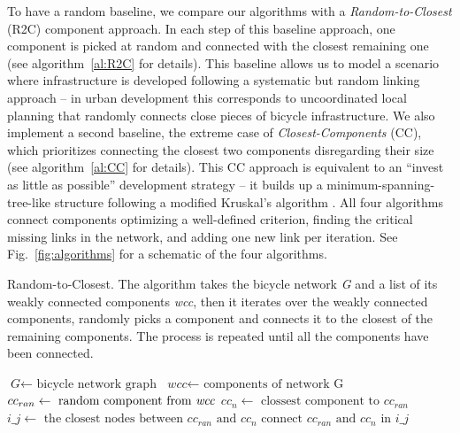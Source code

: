 To have a random baseline, we compare our algorithms with a \emph{Random-to-Closest} (R2C) component approach. In each step of this baseline approach, one component is picked at random and connected with the closest remaining one (see algorithm~\ref{al:R2C} for details). This baseline allows us to model a scenario where infrastructure is developed following a systematic but random linking approach -- in urban development this corresponds to uncoordinated local planning that randomly connects close pieces of bicycle infrastructure. We also implement a second baseline, the extreme case of \emph{Closest-Components} (CC), which prioritizes connecting the closest two components disregarding their size (see algorithm~\ref{al:CC} for details). This CC approach is equivalent to an ``invest as little as possible'' development strategy -- it builds up a minimum-spanning-tree-like structure  following a modified Kruskal's algorithm \cite{Kruskal1956Spanning}. All four algorithms connect components optimizing a well-defined criterion, finding the critical missing links in the network, and adding one new link per iteration. See Fig.~\ref{fig:algorithms} for a schematic of the four algorithms.


\begin{algorithm}[h!]
  \caption{Random-to-Closest. The algorithm takes the bicycle network \textit{G} and a list of its weakly connected components \textit{wcc}, then it iterates over the weakly connected components, randomly picks a component and connects it to the closest of the remaining components. The process is repeated until all the components have been connected.}\label{al:R2C}
  \begin{algorithmic}[1]
    \State $\textit{G} \gets \text{ bicycle network graph}$
    \State $\textit{wcc} \gets \text{ components of network G}$
    \State $cc_{ran} \gets \text{ random component from \textit{wcc}}$
    \State $cc_n \gets \text{ clossest component to } cc_{ran}$
    \State $\textit{i\_j} \gets \text{ the closest nodes between } cc_{ran} \text{ and } cc_n$
    \State $\text{connect } cc_{ran} \text{ and } cc_n \text{ in } i\_j$
    \EndFor
    \EndProcedure
  \end{algorithmic}
\end{algorithm}

